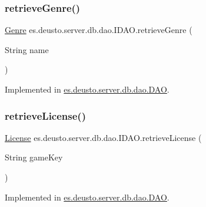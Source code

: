 \subsubsection{\texorpdfstring{retrieve\+Genre()}{retrieveGenre()}}
{\footnotesize\ttfamily \hyperlink{classes_1_1deusto_1_1server_1_1db_1_1data_1_1_genre}{Genre} es.\+deusto.\+server.\+db.\+dao.\+I\+D\+A\+O.\+retrieve\+Genre (\begin{DoxyParamCaption}\item[{String}]{name }\end{DoxyParamCaption})}



Implemented in \hyperlink{classes_1_1deusto_1_1server_1_1db_1_1dao_1_1_d_a_o_a16b0af798fbb00cd29a505491c57e2cd}{es.\+deusto.\+server.\+db.\+dao.\+D\+AO}.

\mbox{\label{interfacees_1_1deusto_1_1server_1_1db_1_1dao_1_1_i_d_a_o_a6a3e25055d4a81c738d1bd73de6ef7da}} 
\subsubsection{\texorpdfstring{retrieve\+License()}{retrieveLicense()}}
{\footnotesize\ttfamily \hyperlink{classes_1_1deusto_1_1server_1_1db_1_1data_1_1_license}{License} es.\+deusto.\+server.\+db.\+dao.\+I\+D\+A\+O.\+retrieve\+License (\begin{DoxyParamCaption}\item[{String}]{game\+Key }\end{DoxyParamCaption})}



Implemented in \hyperlink{classes_1_1deusto_1_1server_1_1db_1_1dao_1_1_d_a_o_a02fd634e6bd7a087b1476ab161af646f}{es.\+deusto.\+server.\+db.\+dao.\+D\+AO}.

\mbox{\label{interfacees_1_1deusto_1_1server_1_1db_1_1dao_1_1_i_d_a_o_a19f9b0d0b6f5f80730d6d197deca7dfc}} 
